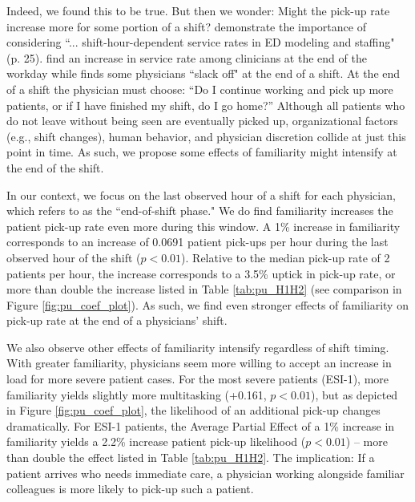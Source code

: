 Indeed, we found this to be true. But then we wonder: Might the pick-up rate increase more for some portion of a shift? \cite{Ouyang2021} demonstrate the importance of considering “... shift-hour-dependent service rates in ED modeling and staffing" (p. 25). \cite{Deo2019} find an increase in service rate among clinicians at the end of the workday while \cite{Chan2018} finds some physicians “slack off" at the end of a shift. At the end of a shift the physician must choose: “Do I continue working and pick up more patients, or if I have finished my shift, do I go home?” Although all patients who do not leave without being seen are eventually picked up, organizational factors (e.g., shift changes), human behavior, and physician discretion collide at just this point in time. As such, we propose some effects of familiarity might intensify at the end of the shift.
 
 In our context, we focus on the last observed hour of a shift for each physician, which \cite{Ouyang2021} refers to as the “end-of-shift phase." We do find familiarity increases the patient pick-up rate even more during this window. A 1\% increase in familiarity corresponds to an increase of 0.0691 patient pick-ups per hour during the last observed hour of the shift ($p < 0.01$). Relative to the median pick-up rate of 2 patients per hour, the increase corresponds to a 3.5\% uptick in pick-up rate, or more than double the increase listed in Table \ref{tab:pu_H1H2} (see comparison in Figure \ref{fig:pu_coef_plot}). As such, we find even stronger effects of familiarity on pick-up rate at the end of a physicians' shift. 
 
 We also observe other effects of familiarity intensify regardless of shift timing. With greater familiarity, physicians seem more willing to accept an increase in load for more severe patient cases. For the most severe patients (ESI-1), more familiarity yields slightly more multitasking (+0.161, $p < 0.01$), but as depicted in Figure \ref{fig:pu_coef_plot}, the likelihood of an additional pick-up changes dramatically. For ESI-1 patients, the Average Partial Effect of a 1\% increase in familiarity yields a 2.2\% increase patient pick-up likelihood ($p < 0.01$) -- more than double the effect listed in Table \ref{tab:pu_H1H2}. The implication: If a patient arrives who needs immediate care, a physician working alongside familiar colleagues is more likely to pick-up such a patient.
 
